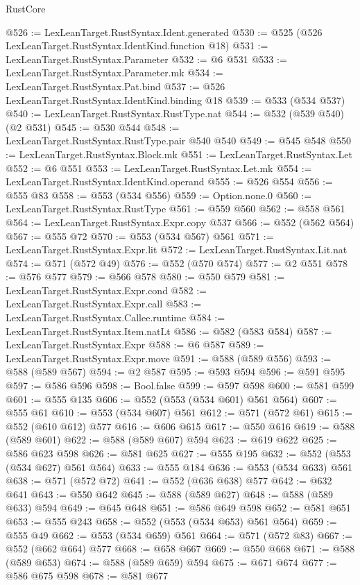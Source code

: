 \begin{lexlean}{RustCore}
\begin{coremodule}
@526 := LexLeanTarget.RustSyntax.Ident.generated
@530 := @525 (@526 LexLeanTarget.RustSyntax.IdentKind.function @18)
@531 := LexLeanTarget.RustSyntax.Parameter
@532 := @6 @531
@533 := LexLeanTarget.RustSyntax.Parameter.mk
@534 := LexLeanTarget.RustSyntax.Pat.bind
@537 := @526 LexLeanTarget.RustSyntax.IdentKind.binding @18
@539 := @533 (@534 @537)
@540 := LexLeanTarget.RustSyntax.RustType.nat
@544 := @532 (@539 @540) (@2 @531)
@545 := @530 @544
@548 := LexLeanTarget.RustSyntax.RustType.pair @540 @540
@549 := @545 @548
@550 := LexLeanTarget.RustSyntax.Block.mk
@551 := LexLeanTarget.RustSyntax.Let
@552 := @6 @551
@553 := LexLeanTarget.RustSyntax.Let.mk
@554 := LexLeanTarget.RustSyntax.IdentKind.operand
@555 := @526 @554
@556 := @555 @83
@558 := @553 (@534 @556)
@559 := Option.none.{0}
@560 := LexLeanTarget.RustSyntax.RustType
@561 := @559 @560
@562 := @558 @561
@564 := LexLeanTarget.RustSyntax.Expr.copy @537
@566 := @552 (@562 @564)
@567 := @555 @72
@570 := @553 (@534 @567) @561
@571 := LexLeanTarget.RustSyntax.Expr.lit
@572 := LexLeanTarget.RustSyntax.Lit.nat
@574 := @571 (@572 @49)
@576 := @552 (@570 @574)
@577 := @2 @551
@578 := @576 @577
@579 := @566 @578
@580 := @550 @579
@581 := LexLeanTarget.RustSyntax.Expr.cond
@582 := LexLeanTarget.RustSyntax.Expr.call
@583 := LexLeanTarget.RustSyntax.Callee.runtime
@584 := LexLeanTarget.RustSyntax.Item.natLt
@586 := @582 (@583 @584)
@587 := LexLeanTarget.RustSyntax.Expr
@588 := @6 @587
@589 := LexLeanTarget.RustSyntax.Expr.move
@591 := @588 (@589 @556)
@593 := @588 (@589 @567)
@594 := @2 @587
@595 := @593 @594
@596 := @591 @595
@597 := @586 @596
@598 := Bool.false
@599 := @597 @598
@600 := @581 @599
@601 := @555 @135
@606 := @552 (@553 (@534 @601) @561 @564)
@607 := @555 @61
@610 := @553 (@534 @607) @561
@612 := @571 (@572 @61)
@615 := @552 (@610 @612) @577
@616 := @606 @615
@617 := @550 @616
@619 := @588 (@589 @601)
@622 := @588 (@589 @607) @594
@623 := @619 @622
@625 := @586 @623 @598
@626 := @581 @625
@627 := @555 @195
@632 := @552 (@553 (@534 @627) @561 @564)
@633 := @555 @184
@636 := @553 (@534 @633) @561
@638 := @571 (@572 @72)
@641 := @552 (@636 @638) @577
@642 := @632 @641
@643 := @550 @642
@645 := @588 (@589 @627)
@648 := @588 (@589 @633) @594
@649 := @645 @648
@651 := @586 @649 @598
@652 := @581 @651
@653 := @555 @243
@658 := @552 (@553 (@534 @653) @561 @564)
@659 := @555 @49
@662 := @553 (@534 @659) @561
@664 := @571 (@572 @83)
@667 := @552 (@662 @664) @577
@668 := @658 @667
@669 := @550 @668
@671 := @588 (@589 @653)
@674 := @588 (@589 @659) @594
@675 := @671 @674
@677 := @586 @675 @598
@678 := @581 @677

\end{coremodule}
\end{lexlean}
